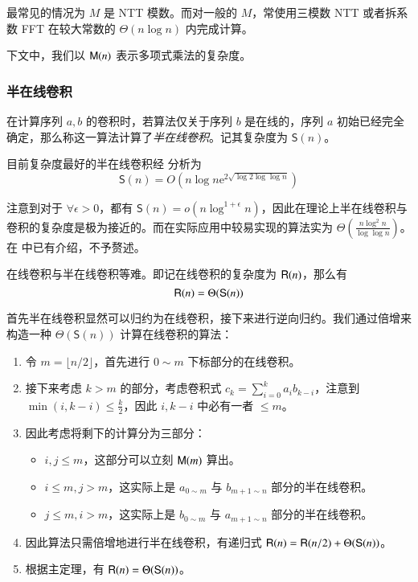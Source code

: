 最常见的情况为 $M$ 是 NTT 模数。而对一般的 $M$，常使用三模数 NTT 或者拆系数 FFT 在较大常数的 $\Theta(n\log n)$ 内完成计算。

下文中，我们以 $\mathsf M(n)$ 表示多项式乘法的复杂度。

\subsubsection{半在线卷积}

\begin{definition}[半在线卷积]
在计算序列 $a,b$ 的卷积时，若算法仅关于序列 $b$ 是在线的，序列 $a$ 初始已经完全确定，那么称这一算法计算了\emph{半在线卷积}。记其复杂度为 $\mathsf S(n)$。
\end{definition}

\begin{theorem}

目前复杂度最好的半在线卷积经 \cite{relaxmul} 分析为
$$
\mathsf{S}(n) = O\left(n\log n\mathrm{e}^{2\sqrt{\log 2\log\log n}}\right)
$$
\end{theorem}

注意到对于 $\forall \epsilon > 0$，都有 $\mathsf{S}(n) = o\left(n\log^{1+\epsilon} n\right)$，因此在理论上半在线卷积与卷积的复杂度是极为接近的。而在实际应用中较易实现的算法实为 $\Theta \left( \frac{n\log ^2 n}{\log \log n} \right)$。在 \cite{nimberpoly} 中已有介绍，不予赘述。

\begin{theorem}
在线卷积与半在线卷积等难。即记在线卷积的复杂度为 $\mathsf R(n)$，那么有
$$
\mathsf R(n)=\Theta(\mathsf S(n))
$$
\end{theorem}

首先半在线卷积显然可以归约为在线卷积，接下来进行逆向归约。我们通过倍增来构造一种 $\Theta(\mathsf S(n))$ 计算在线卷积的算法：

\begin{enumerate}
\item 令 $m=\lfloor n/2\rfloor$，首先进行 $0\sim m$ 下标部分的在线卷积。
\item 接下来考虑 $k > m$ 的部分，考虑卷积式 $c_k = \sum_{i=0}^k a_ib_{k-i}$，注意到 $\min(i,k-i)\le \frac k2$，因此 $i,k-i$ 中必有一者 $\le m$。
\item 因此考虑将剩下的计算分为三部分：
\begin{itemize}
\item $i,j\le m$，这部分可以立刻 $\mathsf M(m)$ 算出。 
\item $i\le m,j>m$，这实际上是 $a_{0\sim m}$ 与 $b_{m+1\sim n}$ 部分的半在线卷积。
\item $j\le m,i>m$，这实际上是 $b_{0\sim m}$ 与 $a_{m+1\sim n}$ 部分的半在线卷积。
\end{itemize}
\item 因此算法只需倍增地进行半在线卷积，有递归式 $\mathsf R(n) = \mathsf R(n/2) + \Theta(\mathsf S(n))$。
\item 根据主定理，有 $\mathsf R(n)=\Theta(\mathsf S(n))$。
\end{enumerate}

